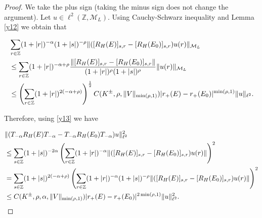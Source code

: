 \documentclass[12pt,oneside,onecolumn,open]{article}
\begin{document}
\begin{proof}

We take the plus sign (taking the minus sign does not change the argument). 
Let \( u \in \ell ^2(\mathbb{Z}, \mathcal{M}_L) \). Using Cauchy-Schwarz inequality and  Lemma \ref{y12} we obtain that

\begin{align}\label{y13}&\notag\sum_{r\in\mathbb{Z}}(1+|r|)^{-\alpha}(1+|s|)^{-\rho}\|([R_{H}(E)]_{s,r}-[R_{H}(E_0)]_{s,r})u(r)\|_{\mathcal{M}_L}\\\notag
&\leq \sum_{r\in\mathbb{Z}}(1+|r|)^{-\alpha + \rho  }\frac{\|[R_{H}(E)]_{s,r}-[R_{H}(E_0)]_{s,r}\|}{(1+|r|)^{ \rho}(1+|s|)^{\rho}}\|u(r)\|_{\mathcal{M}_L}\\
&\leq \left(\sum _{r\in \mathbb{Z}}(1+|r|)^{2(-\alpha + \rho) }\right)^{\frac{1}{2}}C(K^{\pm}, \rho, \| V\|_{\min(\rho, 1)})|r_+(E)-r_+(E_0)|^{\min(\rho, 1)}\|u\|_{\ell ^ 2}.
\end{align}

Therefore, using \eqref{y13} we have

\begin{align}&\notag \|(T_{-\alpha}R_{H}(E)T_{-\alpha}-T_{-\alpha}R_{H}(E_0)T_{-\alpha})u\|^{2}_{\ell ^{2}}\\\notag
&\leq\sum_{s\in\mathbb{Z}}(1+|s|)^{-2\alpha}\left(\sum_{r\in\mathbb{Z}}(1+|r|)^{-\alpha}\|([R_{H}(E)]_{s,r}-[R_{H}(E_0)]_{s,r})u(r)\|\right)^{2}\\\notag
&=\sum_{s\in\mathbb{Z}}(1+|s|)^{2(- \alpha +  \rho) }\left(\sum_{r\in\mathbb{Z}}(1+|r|)^{-\alpha}(1+|s|)^{-\rho}\|([R_{H}(E)]_{s,r}-[R_{H}(E_0)]_{s,r})u(r)\|\right)^{2}\\
&\leq C(K^{\pm }, \rho,\alpha, \| V \|_{ \min(\rho, 1)  } ) |r_+(E)-r_+(E_0)|^{2 \min(\rho, 1) }\|u\|_{\ell ^{2}}^{2}.
\end{align}




\end{proof}
\end{document}
